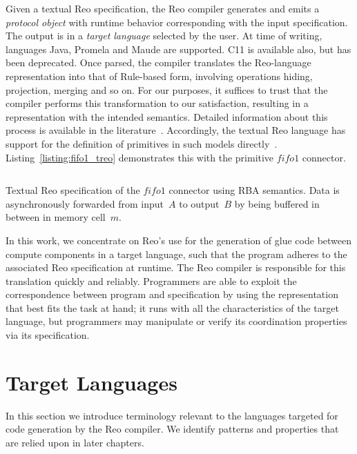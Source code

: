 Given a textual Reo specification, the Reo compiler generates and emits a \textit{protocol object} with runtime behavior corresponding with the input specification. The output is in a \textit{target language} selected by the user. At time of writing, languages Java, Promela and Maude are supported. C11 is available also, but has been deprecated. Once parsed, the compiler translates the Reo-language representation into that of Rule-based form, involving operations hiding, projection, merging and so on. For our purposes, it suffices to trust that the compiler performs this transformation to our satisfaction, resulting in a representation with the intended semantics. Detailed information about this process is available in the literature~\cite{arbab2004reo, arbab2005abstract, dokter2018rule}. Accordingly, the textual Reo language has support for the definition of primitives in such models directly~\cite{dokter2018treo}. Listing~\ref{listing:fifo1_treo} demonstrates this with the primitive $fifo1$ connector. 


\begin{listing}[ht]
	\inputminted[]{text}{fifo1.rba.treo}
	\caption[Fifo1 connector specfication in textual Reo language.]{Textual Reo specification of the $fifo1$ connector using RBA semantics. Data is asynchronously forwarded from input~$A$ to output~$B$ by being buffered in between in memory cell~$m$.}
	\label{listing:fifo1_treo}
\end{listing}

In this work, we concentrate on Reo's use for the generation of glue code between compute components in a target language, such that the program adheres to the associated Reo specification at runtime. The Reo compiler is responsible for this translation quickly and reliably. Programmers are able to exploit the correspondence between program and specification by using the representation that best fits the task at hand; it runs with all the characteristics of the target language, but programmers may manipulate or verify its coordination properties via its specification.


\section{Target Languages}
In this section we introduce terminology relevant to the languages targeted for code generation by the Reo compiler. We identify patterns and properties that are relied upon in later chapters.

